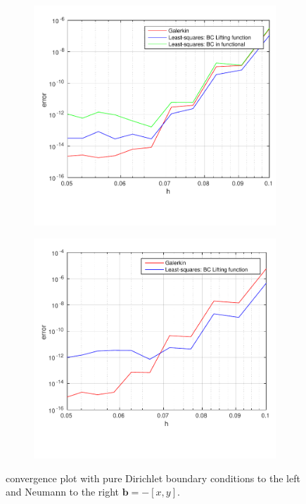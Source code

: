 \begin{figure}[h!]
  \centering
  \begin{subfigure}[b]{0.48\textwidth}
		\includegraphics[width=\textwidth]{Figures/Spec_difftrans_Convergence.pdf}
  \end{subfigure}%
  \quad
  \begin{subfigure}[b]{0.48\textwidth}
		\includegraphics[width=\textwidth]{Figures/Spec_difftrans_Convergence_Neu.pdf}
  \end{subfigure}
  \vspace{-0.1\baselineskip}
	\caption{convergence plot with pure Dirichlet boundary conditions to the left and Neumann to the right  $\mathbf{b} = -[x,y]$.}
  \label{fig:ConvergenceDifftransSpec}
\end{figure}
%

